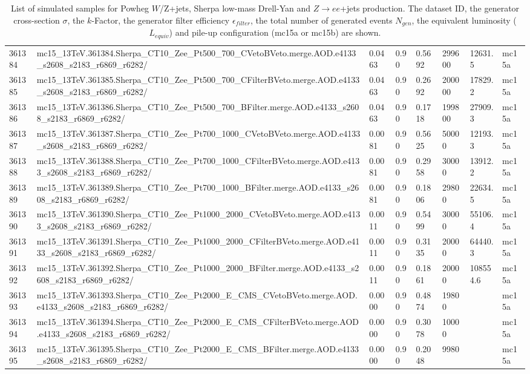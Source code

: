 \begin{sidewaystable}[!htp]
\begin{center}
{\begin{tabular}{llllllll}
361384  &  mc15\_13TeV.361384.Sherpa\_CT10\_Zee\_Pt500\_700\_CVetoBVeto.merge.AOD.e4133\_s2608\_s2183\_r6869\_r6282/  &  0.0463  &  0.90  &  0.5692  &  299600  &  12631.5  &  mc15a \\
361385  &  mc15\_13TeV.361385.Sherpa\_CT10\_Zee\_Pt500\_700\_CFilterBVeto.merge.AOD.e4133\_s2608\_s2183\_r6869\_r6282/  &  0.0463  &  0.90  &  0.2692  &  200000  &  17829.2  &  mc15a \\
361386  &  mc15\_13TeV.361386.Sherpa\_CT10\_Zee\_Pt500\_700\_BFilter.merge.AOD.e4133\_s2608\_s2183\_r6869\_r6282/  &  0.0463  &  0.90  &  0.1718  &  199800  &  27909.3  &  mc15a \\
361387  &  mc15\_13TeV.361387.Sherpa\_CT10\_Zee\_Pt700\_1000\_CVetoBVeto.merge.AOD.e4133\_s2608\_s2183\_r6869\_r6282/  &  0.0081  &  0.90  &  0.5625  &  50000  &  12193.3  &  mc15a \\
361388  &  mc15\_13TeV.361388.Sherpa\_CT10\_Zee\_Pt700\_1000\_CFilterBVeto.merge.AOD.e4133\_s2608\_s2183\_r6869\_r6282/  &  0.0081  &  0.90  &  0.2958  &  30000  &  13912.2  &  mc15a \\
361389  &  mc15\_13TeV.361389.Sherpa\_CT10\_Zee\_Pt700\_1000\_BFilter.merge.AOD.e4133\_s2608\_s2183\_r6869\_r6282/  &  0.0081  &  0.90  &  0.1806  &  29800  &  22634.5  &  mc15a \\
361390  &  mc15\_13TeV.361390.Sherpa\_CT10\_Zee\_Pt1000\_2000\_CVetoBVeto.merge.AOD.e4133\_s2608\_s2183\_r6869\_r6282/  &  0.0011  &  0.90  &  0.5499  &  30000  &  55106.4  &  mc15a \\
361391  &  mc15\_13TeV.361391.Sherpa\_CT10\_Zee\_Pt1000\_2000\_CFilterBVeto.merge.AOD.e4133\_s2608\_s2183\_r6869\_r6282/  &  0.0011  &  0.90  &  0.3135  &  20000  &  64440.3  &  mc15a \\
361392  &  mc15\_13TeV.361392.Sherpa\_CT10\_Zee\_Pt1000\_2000\_BFilter.merge.AOD.e4133\_s2608\_s2183\_r6869\_r6282/  &  0.0011  &  0.90  &  0.1861  &  20000  &  108554.6  &  mc15a \\
361393  &  mc15\_13TeV.361393.Sherpa\_CT10\_Zee\_Pt2000\_E\_CMS\_CVetoBVeto.merge.AOD.e4133\_s2608\_s2183\_r6869\_r6282/  &  0.0000  &  0.90  &  0.4874  &  19800  &   &  mc15a \\
361394  &  mc15\_13TeV.361394.Sherpa\_CT10\_Zee\_Pt2000\_E\_CMS\_CFilterBVeto.merge.AOD.e4133\_s2608\_s2183\_r6869\_r6282/  &  0.0000  &  0.90  &  0.3078  &  10000  &   &  mc15a \\
361395  &  mc15\_13TeV.361395.Sherpa\_CT10\_Zee\_Pt2000\_E\_CMS\_BFilter.merge.AOD.e4133\_s2608\_s2183\_r6869\_r6282/  &  0.0000  &  0.90  &  0.2048  &  9980  &   &  mc15a \\
\hline
\end{tabular}}
\end{center}
\caption{List of simulated samples for Powheg $W$/Z+jets,
   Sherpa low-mass Drell-Yan and $Z\to ee$+jets production. The dataset ID, the generator
  cross-section $\sigma$, the $k$-Factor, the generator filter
  efficiency $\epsilon_{filter}$, the total number of
  generated events $N_{gen}$, the equivalent luminosity ($L_{equiv}$) and pile-up configuration (mc15a or mc15b) are shown.}
\label{tab:BGSamples2}
\end{sidewaystable}

